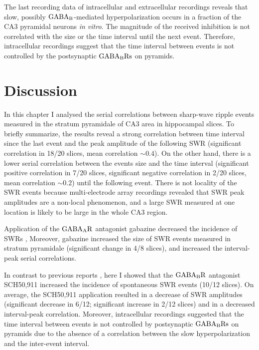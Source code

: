     The last recording data of intracellular and extracellular recordings
    reveals that slow, possibly $\rm GABA_B$-mediated hyperpolarization occurs
    in a fraction of the CA3 pyramidal neurons \textit{in vitro}. The magnitude
    of the received inhibition is not correlated with the size or the time
    interval until the next event. Therefore, intracellular recordings suggest
    that the time interval between events is not controlled by the postsynaptic
    $\rm GABA_B Rs$ on pyramids.
 

\section{Discussion}
  In this chapter I analysed the serial correlations between sharp-wave ripple
  events measured in the stratum pyramidale of CA3 area in hippocampal slices.
  To briefly summarize, the results reveal a strong correlation between time
  interval since the last event and the peak amplitude of the following SWR
  (significant correlation in 18/20 slices, mean correlation $\sim 0.4$). On
  the other hand, there is a lower serial correlation between the events size
  and the time interval (significant positive correlation in 7/20 slices,
  significant negative correlation in 2/20 slices, mean correlation $\sim 0.2$)
  until the following event. There is not locality of the SWR events because
  multi-electrode array recordings revealed that SWR peak amplitudes are a
  non-local phenomenon, and a large SWR measured at one location is likely to
  be large in the whole CA3 region. 
  
  Application of the $\rm GABA_AR$ antagonist gabazine decreased the incidence
  of SWRs \citep[in agreement with][]{Nimmrich2005}, Moreover, gabazine
  increased the size of SWR events measured in stratum pyramidale (significant
  change in 4/8 slices), and increased the interval-peak serial correlations. 

  In contrast to previous reports \citep[i.e.,][]{Hollnagel2014, Hofer2015},
  here I showed that the $\rm GABA_BR$ antagonist SCH50,911 increased the
  incidence of spontaneous SWR events (10/12 slices). On average, the SCH50,911
  application resulted in a decrease of SWR amplitudes (significant decrease in
  6/12; significant increase in 2/12 slices) and in a decreased interval-peak
  correlation. Moreover, intracellular recordings suggested that the time
  interval between events is not controlled by postsynaptic $\rm GABA_B Rs$ on
  pyramids due to the absence of a correlation between the slow
  hyperpolarization and the inter-event interval.

